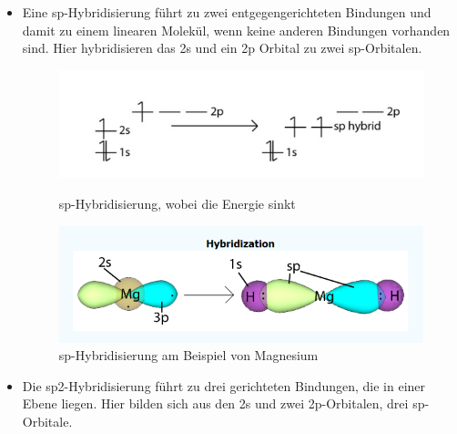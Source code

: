 \begin{itemize}
    \item Eine sp-Hybridisierung führt zu zwei entgegengerichteten Bindungen und damit
          zu einem linearen Molekül, wenn keine anderen Bindungen vorhanden sind. Hier hybridisieren das 2s und ein 2p Orbital zu zwei sp-Orbitalen.
         
          \begin{figure}[H]
            \begin{minipage}[b]{0.5\linewidth} 
               \includegraphics[width=0.8\linewidth]{resources/28-11-2018/sp11.PNG}
               \caption{sp-Hybridisierung, wobei die Energie sinkt}
            \end{minipage}
            \hspace{0.01\linewidth}
            \begin{minipage}[b]{0.5\linewidth} 
               \includegraphics[width=0.8\linewidth]{resources/28-11-2018/sp12.PNG}
               \caption{sp-Hybridisierung am Beispiel von Magnesium }
            \end{minipage}
         \end{figure}

    \item Die sp2-Hybridisierung führt zu drei gerichteten Bindungen, die in einer
          Ebene liegen. Hier bilden sich aus den 2s und zwei 2p-Orbitalen, drei sp-Orbitale.


\end{itemize}
